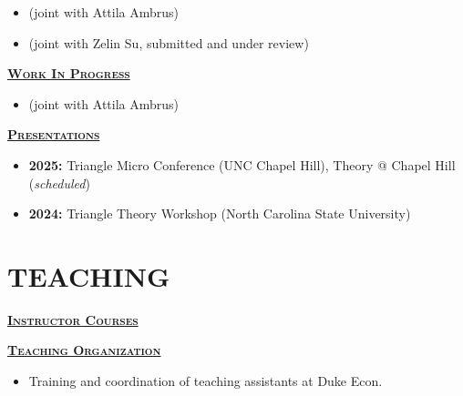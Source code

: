 \documentclass{resume}
\begin{document}
\begin{itemize}
  \item[] (joint with Attila Ambrus)
\end{itemize}

\begin{itemize}
  \item[] (joint with Zelin Su, submitted and under review){}
\end{itemize}

\vspace{0.5ex}

\underline{\textbf{\textsc{\large Work In Progress}}}

\begin{itemize}
  \item[] (joint with Attila Ambrus) 
\end{itemize}


\vspace{0.5ex}

\underline{\textbf{\textsc{\large Presentations}}}

\begin{itemize}
  \item \textbf{2025:} Triangle Micro Conference (UNC Chapel Hill), Theory @ Chapel Hill (\textit{scheduled})
  \item \textbf{2024:} Triangle Theory Workshop (North Carolina State University)
\end{itemize}


\vspace{1ex}

\section{TEACHING}

\underline{\textbf{\textsc{\large Instructor Courses}}}


\newpage

\underline{\textbf{\textsc{\large Teaching Organization}}}

\begin{itemize}
  \item Training and coordination of teaching assistants at Duke Econ.
\end{itemize}
\end{document}
